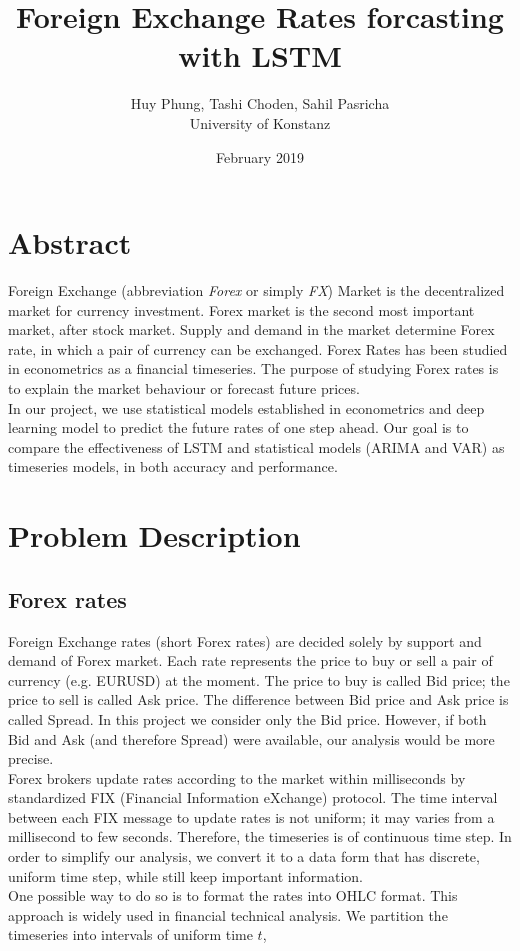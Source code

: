 \documentclass[12pt]{article}
\title{Foreign Exchange Rates forcasting with LSTM}
\author{Huy Phung, Tashi Choden, Sahil Pasricha
  \\University of Konstanz}
\date{February 2019}
\begin{document}
\maketitle
\pagebreak
\tableofcontents
\pagebreak

\section{Abstract}
Foreign Exchange (abbreviation \textit{Forex} or simply \textit{FX}) Market is
the decentralized market for currency investment. Forex market is the second
most important market, after stock market. Supply and demand in the market
determine Forex rate, in which a pair of currency can be exchanged. Forex Rates
has been studied in econometrics as a financial timeseries. The purpose of
studying Forex rates is to explain the market behaviour or forecast future
prices.\\ 
In our project, we use statistical models established in econometrics and deep
learning model to predict the future rates of one step ahead. Our goal is to
compare the effectiveness of LSTM and statistical models (ARIMA and VAR) as
timeseries models, in both accuracy and performance.


\section{Problem Description}
\subsection{Forex rates}
Foreign Exchange rates (short Forex rates) are decided solely by support and
demand of Forex market. Each rate represents the price to buy or sell a pair of
currency (e.g. EURUSD) at the moment. The price to buy is called Bid price; the
price to sell is called Ask price. The difference between Bid price and Ask
price is called Spread. In this project we consider only the Bid price. However,
if both Bid and Ask (and therefore Spread) were available, our analysis would be
more precise.\\
Forex brokers update rates according to the market
within milliseconds by standardized FIX (Financial Information eXchange)
protocol. The time interval between each FIX message to update rates is not
uniform; it may varies from a millisecond to few seconds. Therefore, the
timeseries is of continuous time step. In order to simplify our
analysis, we convert it to a data form that has discrete, uniform time
step, while still keep important information.\\
One possible way to do so is to format the rates into OHLC format. This approach
is widely used in financial technical analysis. We partition the timeseries into
intervals of uniform time $t$, 
\end{document}
